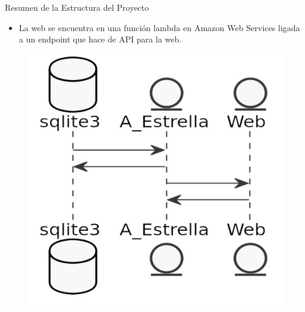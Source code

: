 \documentclass{beamer}
\begin{document}
\begin{frame}{Resumen de la Estructura del Proyecto}
    \begin{itemize}
        \item La web se encuentra en una función lambda en Amazon Web Services ligada a un endpoint que hace de API para la web.
    \end{itemize}
  \begin{figure}[H]
    \centering
    \includegraphics[scale=0.40]{"../pics/diagrama.jpg"}
  \end{figure}
\end{frame}
\end{document}
